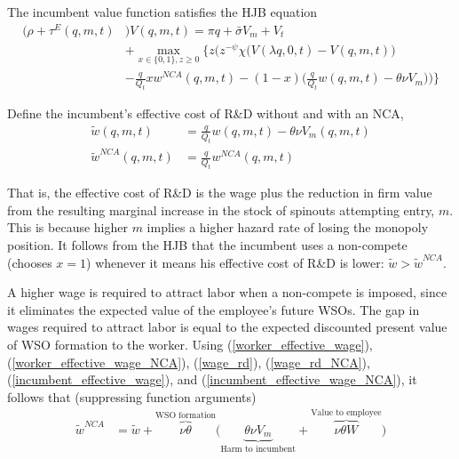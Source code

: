 \documentclass[12pt,english]{article}
\theoremstyle{remark}
\begin{document}
The incumbent value function satisfies the HJB equation
\begin{align}
\big(\rho + \tau^E(q,m,t)& \big)V(q,m,t) = \pi q + \bar{\sigma} V_m + V_t  \nonumber \\
&+ \max_{x \in \{0,1\}, z \ge 0} \Bigg\{ z \Big( z^{-\psi} \chi \big( V(\lambda q, 0, t) - V(q,m,t) \big)  \nonumber \\
&- \frac{q}{Q_t} x w^{NCA}(q,m,t) - (1-x) \big( \frac{q}{Q_t} w(q,m,t) - \theta \nu V_m \big)\Big)    \Bigg\} \label{HJB_I}
\end{align}

Define the incumbent's effective cost of R\&D without and with an NCA, 
\begin{align}
\tilde{w}(q,m,t) &= \frac{q}{Q_t} w(q,m,t) - \theta \nu V_m(q,m,t)  \label{incumbent_effective_wage} \\
\tilde{w}^{NCA}(q,m,t) &= \frac{q}{Q_t} w^{NCA}(q,m,t)  \label{incumbent_effective_wage_NCA} 
\end{align}

That is, the effective cost of R\&D is the wage plus the reduction in firm value from the resulting marginal increase in the stock of spinouts attempting entry, $m$. This is because higher $m$ implies a higher hazard rate of losing the monopoly position. It follows from the HJB that the incumbent uses a non-compete (chooses $x = 1$) whenever it means his effective cost of R\&D is lower: $\tilde{w} > \tilde{w}^{NCA}$. 

A higher wage is required to attract labor when a non-compete is imposed, since it eliminates the expected value of the employee's future WSOs. The gap in wages required to attract labor is equal to the expected discounted present value of WSO formation to the worker. Using (\ref{worker_effective_wage}), (\ref{worker_effective_wage_NCA}), (\ref{wage_rd}), (\ref{wage_rd_NCA}), (\ref{incumbent_effective_wage}), and (\ref{incumbent_effective_wage_NCA}), it follows that (suppressing function arguments)
\begin{align}
\tilde{w}^{NCA} &= \tilde{w} + \overbrace{\nu \theta }^{\textrm{WSO formation}} \Bigg( \underbrace{\theta \nu V_m}_{\textrm{Harm to incumbent}} + \overbrace{\nu \theta W}^{\textrm{Value to employee}} \Bigg)
\end{align} 
\end{document}
